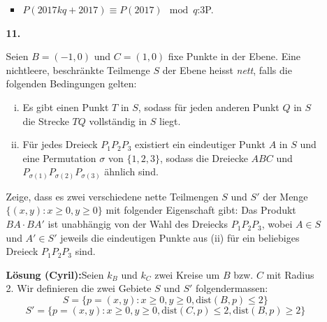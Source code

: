 \documentclass[language=german,style=solution]{smo}
\begin{document}
\begin{enumerate}
\begin{itemize}
\begin{itemize}
\item $P(2017kq + 2017) \equiv P(2017) \mod q$:\hfill 3P.
\end{itemize}

\newpage

\item[\textbf{11.}] %

Seien $B=(-1,0)$ und $C=(1,0)$ fixe Punkte in der Ebene. Eine nichtleere, beschränkte Teilmenge $S$ der Ebene heisst \emph{nett}, falls die folgenden Bedingungen gelten:

\begin{enumerate}[(i)]
\item Es gibt einen Punkt $T$ in $S$, sodass für jeden anderen Punkt $Q$ in $S$ die Strecke $TQ$ vollständig in $S$ liegt.
\item Für jedes Dreieck $P_1P_2P_3$ existiert ein eindeutiger Punkt $A$ in $S$ und eine Permutation $\sigma$ von $\{1, 2, 3\}$, sodass die Dreiecke $ABC$ und $P_{\sigma(1)}P_{\sigma(2)}P_{\sigma(3)}$ ähnlich sind.
\end{enumerate}

Zeige, dass es zwei verschiedene nette Teilmengen $S$ und $S'$ der Menge $\{(x,y):x\geq 0,y\geq 0\}$ mit folgender Eigenschaft gibt: Das Produkt $BA\cdot BA'$ ist unabhängig von der Wahl des Dreiecks $P_1P_2P_3$, wobei $A\in S$ und $A'\in S'$ jeweils die eindeutigen Punkte aus (ii) für ein beliebiges Dreieck $P_1P_2P_3$ sind.

\textbf{Lösung (Cyril):}Seien $k_B$ und $k_C$ zwei Kreise um $B$ bzw. $C$ mit Radius 2. Wir definieren die zwei Gebiete $S$ und $S'$ folgendermassen:
\[
S = \{ p=(x,y) : x \geq 0, y \geq 0, \text{dist}(B,p) \leq 2 \}
\]
\[
S' = \{ p=(x,y) : x \geq 0, y \geq 0, \text{dist}(C,p) \leq 2,  \text{dist}(B,p) \geq 2 \}
\]


\end{itemize}
\end{enumerate}
\end{document}

